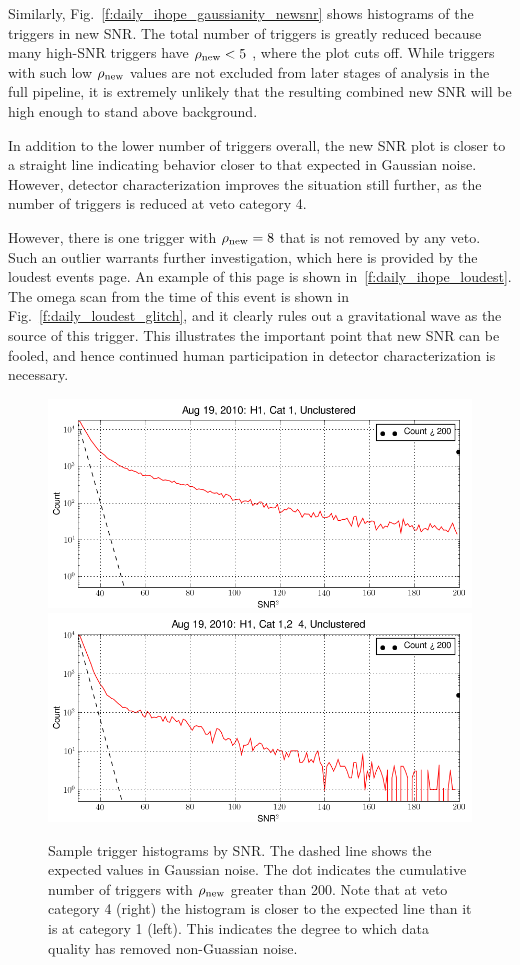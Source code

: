 Similarly, Fig.~\ref{f:daily_ihope_gaussianity_newsnr} shows histograms
of the triggers in new SNR.  The total number of triggers is greatly
reduced because many high-SNR triggers have $\rho_{\textrm{new}} < 5$ , where the
plot cuts off.  While triggers with such low $\rho_{\textrm{new}}$ values are not
excluded from later stages of analysis in the full pipeline, it is
extremely unlikely that the resulting combined new SNR will be high
enough to stand above background.

In addition to the lower number of triggers overall, the new SNR plot
is closer to a straight line indicating behavior closer to that
expected in Gaussian noise.  However, detector characterization
improves the situation still further, as the number of triggers is
reduced at veto category 4.

However, there is one trigger with $\rho_{\textrm{new}} = 8$ that is not removed
by any veto.  Such an outlier warrants further investigation, which
here is provided by the loudest events page.   An example of this page
is shown in~\ref{f:daily_ihope_loudest}.  The omega scan from the time
of this event is shown in Fig.~\ref{f:daily_loudest_glitch}, and it
clearly rules out a gravitational wave as the source of this trigger.
This illustrates the important point that new SNR can be fooled, and
hence continued human participation in detector characterization
is necessary.

\begin{figure}
  \includegraphics[width=0.5\linewidth]{figures/detchar/H1_1_UNCLUSTERED_snr_hist.png}
  \includegraphics[width=0.5\linewidth]{figures/detchar/H1_4_UNCLUSTERED_snr_hist.png}
  \caption[Trigger SNR histograms for H1]{
  \label{f:daily_ihope_gaussianity}
Sample trigger histograms by SNR.  The dashed line shows the
expected values in Gaussian noise.  The dot indicates the cumulative
number of triggers with $\rho_{\textrm{new}}$ greater than 200.  Note that at veto
category 4 (right) the histogram is closer to the expected line than
it is at category 1 (left).  This indicates the degree to which data
quality has removed non-Guassian noise.}
\end{figure}%



